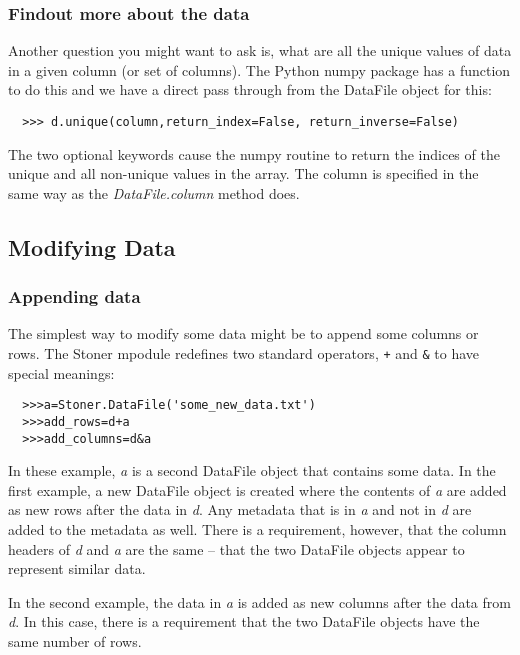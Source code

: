 \documentclass[a4paper,11pt]{scrartcl}
\begin{document}
\subsubsection{Findout more about the data}

Another question you might want to ask is, what are all the unique
values of data in a given column (or set of columns). The Python numpy
package has a function to do this and we have a direct pass through
from the DataFile object for this:

\begin{verbatim}
  >>> d.unique(column,return_index=False, return_inverse=False)
\end{verbatim}

The two optional keywords cause the numpy routine to return the
indices of the unique and all non-unique values in the array. The
column is specified in the same way as the \textit{DataFile.column}
method does.


\subsection{Modifying Data}

\subsubsection{Appending data}

The simplest way to modify some data might be to append some columns or rows. The Stoner mpodule redefines two standard operators, \verb:+: and \verb:&: to have special meanings:
\begin{verbatim}
  >>>a=Stoner.DataFile('some_new_data.txt')
  >>>add_rows=d+a
  >>>add_columns=d&a
\end{verbatim}
In these example, \textit{a} is a second DataFile object that contains some data. In the first example, a new DataFile object is created where the contents of \textit{a} are added as new rows after the data in \textit{d}. Any metadata that is in \textit{a} and not in \textit{d} are added to the metadata as well. There is a requirement, however, that the column headers of \textit{d} and \textit{a} are the same -- \ie that the two DataFile objects appear to represent similar data.

In the second example, the data in \textit{a} is added as new columns after the data from \textit{d}. In this case, there is a requirement that the two DataFile objects have the same number of rows.
\end{document}
